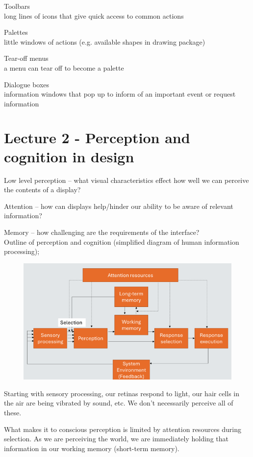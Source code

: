 \documentclass[]{project_plan}
\begin{document}
Toolbars\\
long lines of icons that give quick access to common actions

Palettes\\
little windows of actions (e.g. available shapes in drawing package)

Tear-off menus\\
a menu can tear off to become a palette

Dialogue boxes\\
information windows that pop up to inform of an important event or request information

\chapter{Lecture 2 - Perception and cognition in design}

Low level perception – what visual characteristics effect how well we
can perceive the contents of a display?

Attention – how can displays help/hinder our ability to be aware
of relevant information?

Memory – how challenging are the requirements of the interface?\\

Outline of perception and cognition (simplified diagram of human information processing);
\begin{figure}[h!]
  \centering
  \includegraphics[width=\linewidth]{outline_perception_and_cognition.png}
\end{figure}

Starting with sensory processing, our retinas respond to light, our hair cells in the
air are being vibrated by sound, etc. We don't necessarily perceive all of these.

What makes it to conscious perception is limited by attention resources during
selection. As we are perceiving the world, we are immediately holding that information
in our working memory (short-term memory).
\end{document}

